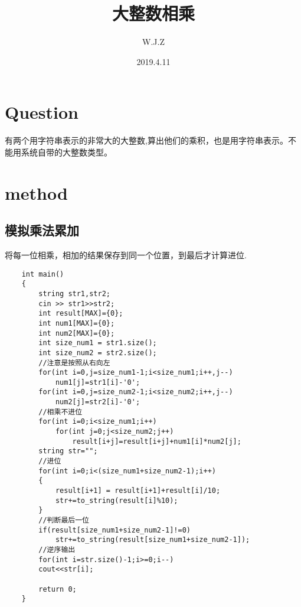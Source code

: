 \documentclass{article}
\title{大整数相乘}
\author{W.J.Z}
\date{2019.4.11}
\begin{document}
	\maketitle
	\section{Question}
	有两个用字符串表示的非常大的大整数,算出他们的乘积，也是用字符串表示。不能用系统自带的大整数类型。
	\section{method}
	\subsection{模拟乘法累加}
	将每一位相乘，相加的结果保存到同一个位置，到最后才计算进位.
	\begin{lstlisting}
	int main()
	{
		string str1,str2;
		cin >> str1>>str2;
		int result[MAX]={0};
		int num1[MAX]={0};
		int num2[MAX]={0};
		int size_num1 = str1.size();
		int size_num2 = str2.size();
		//注意是按照从右向左
		for(int i=0,j=size_num1-1;i<size_num1;i++,j--)
			num1[j]=str1[i]-'0';
		for(int i=0,j=size_num2-1;i<size_num2;i++,j--)
			num2[j]=str2[i]-'0';
		//相乘不进位
		for(int i=0;i<size_num1;i++)
			for(int j=0;j<size_num2;j++)
				result[i+j]=result[i+j]+num1[i]*num2[j];
		string str="";
		//进位
		for(int i=0;i<(size_num1+size_num2-1);i++)
		{
			result[i+1] = result[i+1]+result[i]/10;
			str+=to_string(result[i]%10);
		}
		//判断最后一位
		if(result[size_num1+size_num2-1]!=0)
			str+=to_string(result[size_num1+size_num2-1]);
		//逆序输出
		for(int i=str.size()-1;i>=0;i--)
		cout<<str[i];
	
		return 0;
	}

	\end{lstlisting}
		
\end{document}
